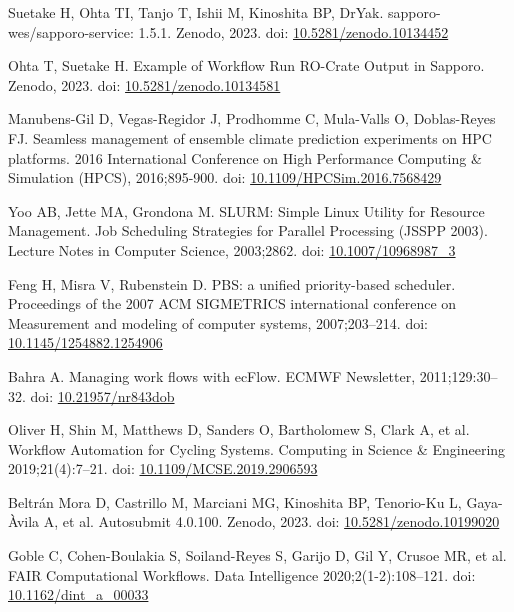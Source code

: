 \documentclass[10pt,letterpaper]{article}
\begin{document}
\begin{thebibliography}{10}
\begin{small}
Suetake H, Ohta TI, Tanjo T, Ishii M, Kinoshita BP, DrYak.
sapporo-wes/sapporo-service: 1.5.1.
Zenodo, 2023.
doi: \href{https://doi.org/10.5281/zenodo.10134452}{10.5281/zenodo.10134452}

Ohta T, Suetake H.
Example of Workflow Run RO-Crate Output in Sapporo.
Zenodo, 2023.
doi: \href{https://doi.org/10.5281/zenodo.10134581}{10.5281/zenodo.10134581}

Manubens-Gil D, Vegas-Regidor J, Prodhomme C, Mula-Valls O, Doblas-Reyes FJ.
Seamless management of ensemble climate prediction experiments on HPC platforms.
2016 International Conference on High Performance Computing \& Simulation (HPCS), 2016;895-900.
doi: \href{https://doi.org/10.1109/HPCSim.2016.7568429}{10.1109/HPCSim.2016.7568429}

Yoo AB, Jette MA, Grondona M.
SLURM: Simple Linux Utility for Resource Management.
Job Scheduling Strategies for Parallel Processing (JSSPP 2003). Lecture Notes in Computer Science, 2003;2862.
doi: \href{https://doi.org/10.1007/10968987_3}{10.1007/10968987\_3}

Feng H, Misra V, Rubenstein D.
PBS: a unified priority-based scheduler.
Proceedings of the 2007 ACM SIGMETRICS international conference on Measurement and modeling of computer systems, 2007;203--214.
doi: \href{https://doi.org/10.1145/1254882.1254906}{10.1145/1254882.1254906}

Bahra A.
Managing work flows with ecFlow.
ECMWF Newsletter, 2011;129:30--32.
doi: \href{https://doi.org/10.21957/nr843dob}{10.21957/nr843dob}

Oliver H, Shin M, Matthews D, Sanders O, Bartholomew S, Clark A, et al.
Workflow Automation for Cycling Systems.
Computing in Science \& Engineering 2019;21(4):7--21.
doi: \href{https://doi.org/10.1109/MCSE.2019.2906593}{10.1109/MCSE.2019.2906593}

Beltrán Mora D, Castrillo M, Marciani MG, Kinoshita BP, Tenorio-Ku L, Gaya-Àvila A, et al.
Autosubmit 4.0.100.
Zenodo, 2023.
doi: \href{https://doi.org/10.5281/zenodo.10199020}{10.5281/zenodo.10199020}

Goble C, Cohen-Boulakia S, Soiland-Reyes S, Garijo D, Gil Y, Crusoe MR, et al.
FAIR Computational Workflows.
Data Intelligence 2020;2(1-2):108--121.
doi: \href{https://doi.org/10.1162/dint_a_00033}{10.1162/dint\_a\_00033}


\end{small}
\end{thebibliography}
\end{document}

